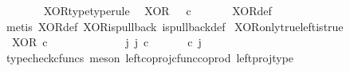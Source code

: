 \begin{isabellebody}
\isanewline
%
\endisadelimproof
\ \ \ \ \ \ \isanewline
{}\isamarkupfalse%
\ XOR{\isacharunderscore}{\kern0pt}type{\isacharbrackleft}{\kern0pt}type{\isacharunderscore}{\kern0pt}rule{\isacharbrackright}{\kern0pt}{\isacharcolon}{\kern0pt}\isanewline
\ \ {\isachardoublequoteopen}XOR\ {\isacharcolon}{\kern0pt}\ {\isasymOmega}\ {\isasymtimes}\isactrlsub c\ {\isasymOmega}\ {\isasymrightarrow}\ {\isasymOmega}{\isachardoublequoteclose}\isanewline
%
\isadelimproof
\ \ %
\endisadelimproof
%
\isatagproof
{}\isamarkupfalse%
\ XOR{\isacharunderscore}{\kern0pt}def\isanewline
\ \ \isamarkupfalse%
\ {\isacharparenleft}{\kern0pt}metis\ XOR{\isacharunderscore}{\kern0pt}def\ XOR{\isacharunderscore}{\kern0pt}is{\isacharunderscore}{\kern0pt}pullback\ is{\isacharunderscore}{\kern0pt}pullback{\isacharunderscore}{\kern0pt}def{\isacharparenright}{\kern0pt}%
\endisatagproof
{\isafoldproof}%
%
\isadelimproof
\isanewline
%
\endisadelimproof
\isanewline
{}\isamarkupfalse%
\ XOR{\isacharunderscore}{\kern0pt}only{\isacharunderscore}{\kern0pt}true{\isacharunderscore}{\kern0pt}left{\isacharunderscore}{\kern0pt}is{\isacharunderscore}{\kern0pt}true{\isacharcolon}{\kern0pt}\isanewline
\ \ {\isachardoublequoteopen}XOR\ {\isasymcirc}\isactrlsub c\ \ {\isasymlangle}{\isasymt}{\isacharcomma}{\kern0pt}{\isasymf}{\isasymrangle}\ {\isacharequal}{\kern0pt}\ {\isasymt}{\isachardoublequoteclose}\isanewline
%
\isadelimproof
%
\endisadelimproof
%
\isatagproof
{}\isamarkupfalse%
\ {\isacharminus}{\kern0pt}\ \ \ \isanewline
\ \ \isamarkupfalse%
\ {\isachardoublequoteopen}{\isasymexists}\ j{\isachardot}{\kern0pt}\ j\ {\isasymin}\isactrlsub c\ {\isasymone}{\isasymCoprod}{\isasymone}\ {\isasymand}\ {\isacharparenleft}{\kern0pt}{\isasymlangle}{\isasymt}{\isacharcomma}{\kern0pt}\ {\isasymf}{\isasymrangle}\ {\isasymamalg}{\isasymlangle}{\isasymf}{\isacharcomma}{\kern0pt}\ {\isasymt}{\isasymrangle}{\isacharparenright}{\kern0pt}\ {\isasymcirc}\isactrlsub c\ j\ \ {\isacharequal}{\kern0pt}\ {\isasymlangle}{\isasymt}{\isacharcomma}{\kern0pt}{\isasymf}{\isasymrangle}{\isachardoublequoteclose}\isanewline
\ \ \ \ \isamarkupfalse%
\ {\isacharparenleft}{\kern0pt}typecheck{\isacharunderscore}{\kern0pt}cfuncs{\isacharcomma}{\kern0pt}\ meson\ left{\isacharunderscore}{\kern0pt}coproj{\isacharunderscore}{\kern0pt}cfunc{\isacharunderscore}{\kern0pt}coprod\ left{\isacharunderscore}{\kern0pt}proj{\isacharunderscore}{\kern0pt}type{\isacharparenright}{\kern0pt}\isanewline
\ \ \isamarkupfalse%
\ \isamarkupfalse%

\end{isabellebody}
